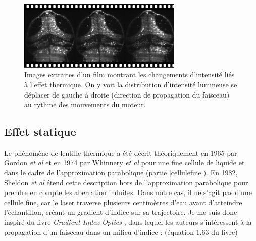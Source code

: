 
\begin{figure}
\centering
\includegraphics[width=0.7\textwidth]{./files/water_instability.svg.png}
\caption{Images extraites d'un film montrant les changements d'intensité liés à l'effet thermique. On y voit la distribution d'intensité lumineuse se déplacer de gauche à droite (direction de propagation du faisceau) au rythme des mouvements du moteur.
\label{FIGwaterinstability}}
\end{figure}




\subsection{Effet statique}


Le phénomène de lentille thermique a été décrit théoriquement en 1965 par Gordon \emph{et al} \cite{gordon_longtransient_1965} et en 1974 par Whinnery \emph{et al} \cite{whinnery_laser_1974} pour une fine cellule de liquide et dans le cadre de l'approximation parabolique (partie \ref{cellulefine}). En 1982, Sheldon \emph{et al} \cite{sheldon_laser-induced_1982} étend cette description hors de l'approximation parabolique pour prendre en compte les aberration induites. Dans notre cas, il ne s'agit pas d'une cellule fine, car le laser traverse plusieurs centimètres d'eau avant d'atteindre l'échantillon, créant un gradient d'indice sur sa trajectoire. Je me suis donc inspiré du livre \emph{Gradient-Index Optics} \cite{gomez-reino_gradient-index_2002}, dans lequel les auteurs s'intéressent à la propagation d'un faisceau dans un milieu d'indice : (équation 1.63 du livre)

